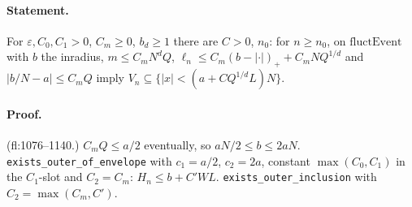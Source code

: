 \paragraph{Statement.} For $\varepsilon,C_0,C_1>0$, $C_m\geq0$, $b_d\geq1$ there are $C>0$, $n_0$: for $n\geq n_0$, on $\mathrm{fluctEvent}$ with $b$ the inradius,
$m\leq C_mN^dQ$, $\ell_n\leq C_m(b-|\cdot|)_++C_mNQ^{1/d}$ and $|b/N-a|\leq C_mQ$ imply $V_n\subseteq\{|x|<(a+CQ^{1/d}L)N\}$.
\paragraph{Proof.} (fl:1076--1140.) $C_mQ\leq a/2$ eventually, so $aN/2\leq b\leq2aN$. \texttt{exists\_outer\_of\_envelope} with $c_1=a/2$, $c_2=2a$, constant $\max(C_0,C_1)$ in the
$C_1$-slot and $C_2=C_m$: $H_n\leq b+C'WL$. \texttt{exists\_outer\_inclusion} with $C_2=\max(C_m,C')$.
